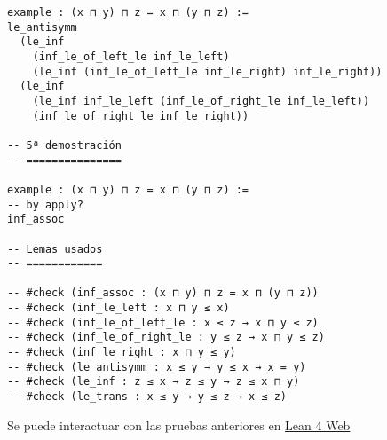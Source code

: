 \begin{verbatim}
example : (x ⊓ y) ⊓ z = x ⊓ (y ⊓ z) :=
le_antisymm
  (le_inf
    (inf_le_of_left_le inf_le_left)
    (le_inf (inf_le_of_left_le inf_le_right) inf_le_right))
  (le_inf
    (le_inf inf_le_left (inf_le_of_right_le inf_le_left))
    (inf_le_of_right_le inf_le_right))

-- 5ª demostración
-- ===============

example : (x ⊓ y) ⊓ z = x ⊓ (y ⊓ z) :=
-- by apply?
inf_assoc

-- Lemas usados
-- ============

-- #check (inf_assoc : (x ⊓ y) ⊓ z = x ⊓ (y ⊓ z))
-- #check (inf_le_left : x ⊓ y ≤ x)
-- #check (inf_le_of_left_le : x ≤ z → x ⊓ y ≤ z)
-- #check (inf_le_of_right_le : y ≤ z → x ⊓ y ≤ z)
-- #check (inf_le_right : x ⊓ y ≤ y)
-- #check (le_antisymm : x ≤ y → y ≤ x → x = y)
-- #check (le_inf : z ≤ x → z ≤ y → z ≤ x ⊓ y)
-- #check (le_trans : x ≤ y → y ≤ z → x ≤ z)
\end{verbatim}
Se puede interactuar con las pruebas anteriores en \href{https://lean.math.hhu.de/\#url=https://raw.githubusercontent.com/jaalonso/Calculemus2/main/src/Asociatividad\_del\_infimo.lean}{Lean 4 Web}

